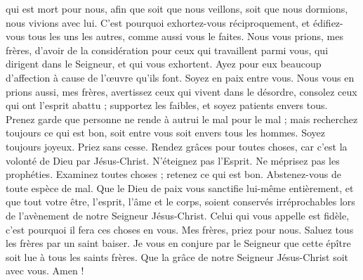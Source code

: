 \begin{multicols}{2}
qui est mort pour nous, afin que soit que nous veillons, soit que nous dormions, nous vivions avec lui.
C'est pourquoi exhortez-vous réciproquement, et édifiez-vous tous les uns les autres, comme aussi vous le faites.
Nous vous prions, mes frères, d’avoir de la considération pour ceux qui travaillent parmi vous, qui dirigent dans le Seigneur, et qui vous exhortent.
Ayez pour eux beaucoup d’affection à cause de l’œuvre qu'ils font. Soyez en paix entre vous.
Nous vous en prions aussi, mes frères, avertissez ceux qui vivent dans le désordre, consolez ceux qui ont l'esprit abattu ; supportez les faibles, et soyez patients envers tous.
Prenez garde que personne ne rende à autrui le mal pour le mal ; mais recherchez toujours ce qui est bon, soit entre vous soit envers tous les hommes.
Soyez toujours joyeux.
Priez sans cesse.
Rendez grâces pour toutes choses, car c'est la volonté de Dieu par Jésus-Christ.
N'éteignez pas l'Esprit.
Ne méprisez pas les prophéties.
Examinez toutes choses ; retenez ce qui est bon.
Abstenez-vous de toute espèce de mal.
Que le Dieu de paix vous sanctifie lui-même entièrement, et que tout votre être, l’esprit, l'âme et le corps, soient conservés irréprochables lors de l’avènement de notre Seigneur Jésus-Christ.
Celui qui vous appelle est fidèle, c'est pourquoi il fera ces choses en vous.
\TextTitle{[Conclusion]}
Mes frères, priez pour nous.
Saluez tous les frères par un saint baiser.
Je vous en conjure par le Seigneur que cette épître soit lue à tous les saints frères.
Que la grâce de notre Seigneur Jésus-Christ soit avec vous. Amen !
\PPE{}
\end{multicols}
